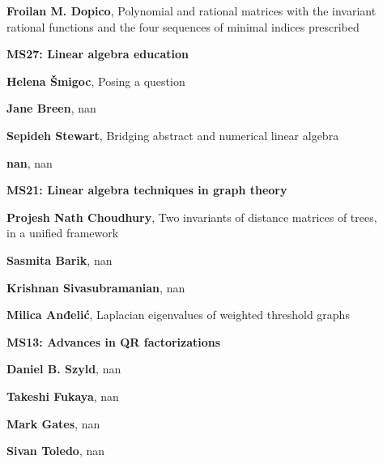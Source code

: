 \documentclass[ILAS2025-program.tex]{subfiles}
\begin{document}
\begin{description}
\begin{description}
        \item[] \textbf{Froilan M. Dopico}, Polynomial and rational matrices with the invariant rational functions and the four sequences of minimal indices prescribed
        \end{description}
    \begin{description}
    \item[] {\color{mstitle}\textbf{MS27: Linear algebra education}} 
    \item[] \textbf{Helena Šmigoc}, Posing a question
        \item[] \textbf{Jane Breen}, nan
        \item[] \textbf{Sepideh Stewart}, Bridging abstract and numerical linear algebra
        \item[] \textbf{nan}, nan
        \end{description}
    \begin{description}
    \item[] {\color{mstitle}\textbf{MS21: Linear algebra techniques in graph theory}} 
    \item[] \textbf{Projesh Nath Choudhury}, Two invariants of distance matrices of trees, in a unified framework
        \item[] \textbf{Sasmita Barik}, nan
        \item[] \textbf{Krishnan Sivasubramanian}, nan
        \item[] \textbf{Milica Anđelić}, Laplacian eigenvalues of weighted threshold graphs
        \end{description}
    \begin{description}
    \item[] {\color{mstitle}\textbf{MS13: Advances in QR factorizations}} 
    \item[] \textbf{Daniel B. Szyld}, nan
        \item[] \textbf{Takeshi Fukaya}, nan
        \item[] \textbf{Mark Gates}, nan
        \item[] \textbf{Sivan Toledo}, nan
        \end{description}
    \begin{description}

\end{description}
\end{description}
\end{document}
